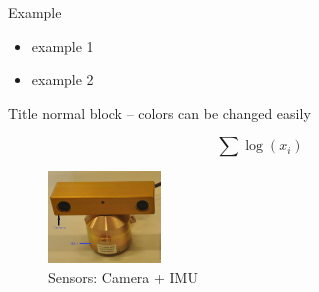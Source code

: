 \documentclass[8pt]{beamer}
\begin{document}

\begin{frame}{Example}
  \begin{itemize}
    \item example 1
    \item example 2
  \end{itemize}

  \begin{block}{Title}
    normal block -- colors can be changed easily
  \end{block}

  \begin{equation}
    \sum \log (x_i)
    \label{}
  \end{equation}

	
  \begin{figure}[hl]
    \includegraphics[width=3cm]{figures/bumblebee_imu.png}
    \caption{Sensors: Camera + IMU}
  \end{figure}
  
  
\end{frame}
\end{document}
